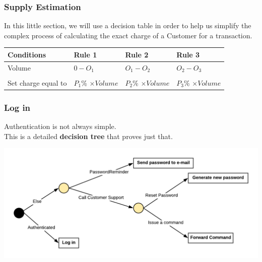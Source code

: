\documentclass{article}
\begin{document}
\subsubsection{Supply Estimation}
In this little section, we will use a decision table in order to help us simplify the complex process of calculating the exact charge of a Customer for a transaction.
\begin{table}[htbp]
\begin{tabular}{|l|l|l|l|}
\hline
\rowcolor[HTML]{EFEFEF} 
\textbf{Conditions} & Rule 1               & Rule 2               & Rule 3               \\ \hline
Volume              & $0 - O_1$            & $O_1-O_2$            & $O_2-O_3$            \\ \hline
\rowcolor[HTML]{EFEFEF} 
\multicolumn{4}{|l|}{\cellcolor[HTML]{EFEFEF}\textbf{Actions}}                           \\ \hline
Set charge equal to & $P_1$\% $\times Volume$ & $P_2$\% $\times Volume$ & $P_3$\% $\times Volume$ \\ \hline
\end{tabular}
\end{table}

\newpage
\subsubsection{Log in}
Authentication is not always simple.\\
This is a detailed \textbf{decision tree} that proves just that.\\
\begin{center}
\hspace*{5mm}\includegraphics[scale=0.4]{decisionTree}
\end{center} 
\end{document}
